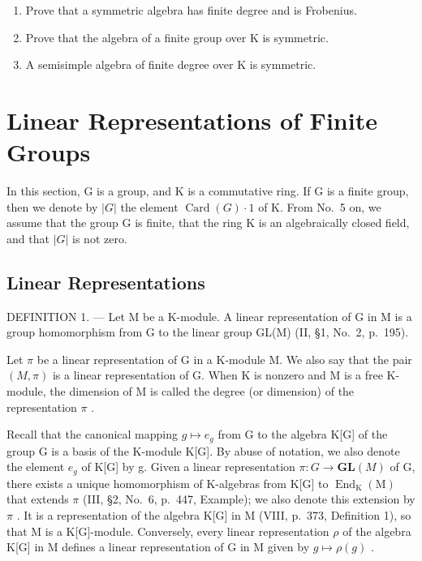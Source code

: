 \begin{enumerate}
\def\labelenumi{\alph{enumi})}
\item
  Prove that a symmetric algebra has finite degree and is Frobenius.
\item
  Prove that the algebra of a finite group over \(\mathrm{K}\) is symmetric.
\item
  A semisimple algebra of finite degree over \(\mathrm{K}\) is symmetric.
\end{enumerate}

\section{Linear Representations of Finite Groups}

In this section, G is a group, and K is a commutative ring. If G is a finite group, then we denote by \(|G|\) the element \(\operatorname{Card}(G) \cdot 1\) of K. From No.~5 on, we assume that the group G is finite, that the ring K is an algebraically closed field, and that \(|G|\) is not zero.

\subsection{Linear Representations}

DEFINITION 1. --- Let M be a K-module. A linear representation of G in M is a group homomorphism from G to the linear group GL(M) (II, §1, No.~2, p.~195).

Let \(\pi\) be a linear representation of G in a K-module M. We also say that the pair \((M,\pi)\) is a linear representation of G. When K is nonzero and M is a free K-module, the dimension of M is called the degree (or dimension) of the representation \(\pi\) .

Recall that the canonical mapping \(g \mapsto e_{g}\) from G to the algebra K{[}G{]} of the group G is a basis of the K-module K{[}G{]}. By abuse of notation, we also denote the element \(e_{g}\) of K{[}G{]} by g. Given a linear representation \(\pi : G \to \mathbf{GL}(M)\) of G, there exists a unique homomorphism of K-algebras from K{[}G{]} to \(\operatorname{End}_{\mathrm{K}}(\mathrm{M})\) that extends \(\pi\) (III, §2, No.~6, p.~447, Example); we also denote this extension by \(\pi\) . It is a representation of the algebra K{[}G{]} in M (VIII, p.~373, Definition 1), so that M is a K{[}G{]}-module. Conversely, every linear representation \(\rho\) of the algebra K{[}G{]} in M defines a linear representation of G in M given by \(g \mapsto \rho(g)\) .

